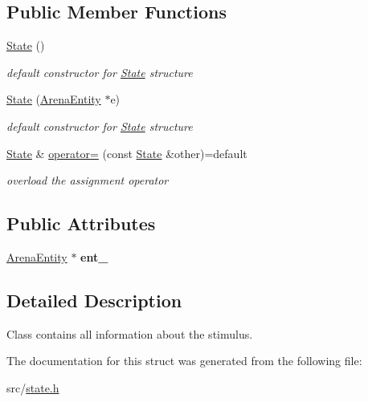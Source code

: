 \subsection*{Public Member Functions}
\begin{DoxyCompactItemize}
\item 
\hyperlink{structState_ab91bb1dd5aa6260ab2a456581daf9ec2}{State} ()\hypertarget{structState_ab91bb1dd5aa6260ab2a456581daf9ec2}{}\label{structState_ab91bb1dd5aa6260ab2a456581daf9ec2}

\begin{DoxyCompactList}\small\item\em default constructor for \hyperlink{structState}{State} structure \end{DoxyCompactList}\item 
\hyperlink{structState_af7eef72ded592ccd74e2710e09ffc45a}{State} (\hyperlink{classArenaEntity}{Arena\+Entity} $\ast$e)\hypertarget{structState_af7eef72ded592ccd74e2710e09ffc45a}{}\label{structState_af7eef72ded592ccd74e2710e09ffc45a}

\begin{DoxyCompactList}\small\item\em default constructor for \hyperlink{structState}{State} structure \end{DoxyCompactList}\item 
\hyperlink{structState}{State} \& \hyperlink{structState_a4b7c5b093524d354b888af4f84e80fca}{operator=} (const \hyperlink{structState}{State} \&other)=default\hypertarget{structState_a4b7c5b093524d354b888af4f84e80fca}{}\label{structState_a4b7c5b093524d354b888af4f84e80fca}

\begin{DoxyCompactList}\small\item\em overload the assignment operator \end{DoxyCompactList}\end{DoxyCompactItemize}
\subsection*{Public Attributes}
\begin{DoxyCompactItemize}
\item 
\hyperlink{classArenaEntity}{Arena\+Entity} $\ast$ {\bfseries ent\+\_\+}\hypertarget{structState_ac29871e3faedb1479113762776ec99aa}{}\label{structState_ac29871e3faedb1479113762776ec99aa}

\end{DoxyCompactItemize}


\subsection{Detailed Description}
Class contains all information about the stimulus. 

The documentation for this struct was generated from the following file\+:\begin{DoxyCompactItemize}
\item 
src/\hyperlink{state_8h}{state.\+h}\end{DoxyCompactItemize}
